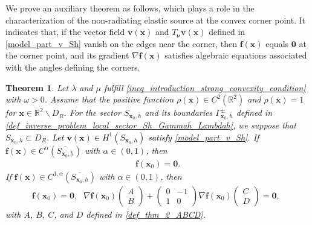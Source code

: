 \documentclass[11pt,reqno,oneside]{amsart}
\newtheorem{theorem}{Theorem}[section]
\theoremstyle{definition}
\theoremstyle{remark}
\numberwithin{equation}{section}
\numberwithin{equation}{section}
\theoremstyle{remark}
\begin{document}
We prove an auxiliary theorem as follows, which plays a role in the characterization of the non-radiating elastic source at the convex corner point. It indicates that, if the vector field $ \mathbf{v}\left(\mathbf{x}\right) $ and $ T_{\bm{\nu}} \mathbf{v}\left(\mathbf{x}\right) $ defined in \eqref{model_part_v_Sh} vanish on the edges near the corner, then $ \mathbf{f}\left(\mathbf{x}\right) $ equals $ \mathbf{0} $ at the corner point, and its gradient $ \nabla\mathbf{f}\left(\mathbf{x}\right) $ satisfies algebraic equations associated with the angles defining the corners.

\begin{theorem} \label{thm_inverse_problem_Sh_f0=0_nablaf0=0}
	Let $ \lambda $ and $ \mu $ fulfill \eqref{ineq_introduction_strong_convexity_condition} with $ \omega > 0 $. Assume that the positive function $ \rho\left(\mathbf{x}\right)\in C^2\left(\mathbb{R}^2\right) $ and $ \rho\left(\mathbf{x}\right)=1 $ for $ \mathbf{x}\in\mathbb{R}^2 \backslash D_R $. For the sector $ S_{\mathbf{x}_0,h} $ and its boundaries $ \Gamma_{\mathbf{x}_0,h}^\pm $ defined in \eqref{def_inverse_problem_local_sector_Sh_Gammah_Lambdah}, we suppose that $ S_{\mathbf{x}_0,h}\subset D_R $. \textcolor{black}{Let $ \mathbf{v}\left(\mathbf{x}\right) \in H^1\left(S_{\mathbf{x}_0,h}\right) $ satisfy} \eqref{model_part_v_Sh}. If $\mathbf{f}\left(\mathbf{x}\right) \in C^{\alpha} \left(\overline{S_{\mathbf{x}_0,h}}\right)$ with $\alpha\in (0,1)$,  then \begin{align*} 
\mathbf{f} \left(\mathbf{x}_0\right) = \bm{0}. 
	\end{align*}
If $\mathbf{f}\left(\mathbf{x}\right) \in C^{1,\alpha} \left(\overline{S_{\mathbf{x}_0,h}}\right)$ with $\alpha\in (0,1)$,  then 
	\begin{equation} \label{eq_IP_gradientf}
\mathbf{f} \left(\mathbf{x}_0\right) = \bm{0},\	\begin{aligned}
			\nabla\mathbf{f}\left(\mathbf{x}_0\right)
			\begin{pmatrix}
				A \\ 
				B
			\end{pmatrix}
			+
			\begin{pmatrix}
				0 & -1 \\
				1 & 0
			\end{pmatrix}
			\nabla\mathbf{f}\left(\mathbf{x}_0\right)
			\begin{pmatrix}
				C \\ 
				D
			\end{pmatrix}
			=\mathbf{0},
		\end{aligned}
	\end{equation}
	with $ A $, $ B $, $ C $, and $ D $ defined in \eqref{def_thm_2_ABCD}. 
\end{theorem}
\end{document}
